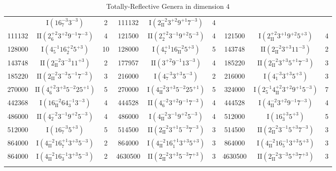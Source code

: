 \documentclass{amsart}
\theoremstyle{definition}
\theoremstyle{remark}
\begin{document}
\begin{center}
\begin{longtable}{ccc|ccc|ccc}
&$\mathrm{I}(16_{7}^{-3}3^{-3})$&2&111132&$\mathrm{I}(2_{\mathrm{II}}^{-2}3^{+2}9^{+1}7^{-3})$&4\\111132&$\mathrm{II}(2_{6}^{+2}3^{+2}9^{-1}7^{-3})$&4&121500&$\mathrm{II}(2_{2}^{+2}3^{-1}9^{+2}5^{-3})$&4&121500&$\mathrm{I}(2_{\mathrm{II}}^{+2}3^{+1}9^{+2}5^{+3})$&4\\128000&$\mathrm{I}(4_{5}^{-1}16_{2}^{+2}5^{+3})$&10&128000&$\mathrm{I}(4_{7}^{+1}16_{\mathrm{II}}^{-2}5^{+3})$&5&143748&$\mathrm{II}(2_{\mathrm{II}}^{-2}3^{+3}11^{-3})$&2\\143748&$\mathrm{II}(2_{\mathrm{II}}^{-2}3^{-3}11^{+3})$&2&177957&$\mathrm{II}(3^{+2}9^{-1}13^{-3})$&4&185220&$\mathrm{II}(2_{\mathrm{II}}^{-2}3^{+3}5^{+1}7^{-3})$&3\\185220&$\mathrm{II}(2_{\mathrm{II}}^{-2}3^{-3}5^{-1}7^{-3})$&3&216000&$\mathrm{I}(4_{7}^{-3}3^{+3}5^{-3})$&2&216000&$\mathrm{I}(4_{1}^{-3}3^{+3}5^{+3})$&3\\270000&$\mathrm{II}(4_{6}^{+2}3^{+3}5^{-2}25^{+1})$&5&270000&$\mathrm{I}(4_{\mathrm{II}}^{-2}3^{+3}5^{-2}25^{+1})$&5&324000&$\mathrm{I}(2_{5}^{-1}4_{\mathrm{II}}^{+2}3^{+2}9^{+1}5^{-3})$&7\\442368&$\mathrm{I}(16_{\mathrm{II}}^{-2}64_{3}^{-1}3^{-3})$&4&444528&$\mathrm{II}(4_{6}^{-2}3^{+2}9^{-1}7^{-3})$&4&444528&$\mathrm{I}(4_{\mathrm{II}}^{-2}3^{+2}9^{-1}7^{-3})$&4\\486000&$\mathrm{II}(4_{2}^{-2}3^{-1}9^{+2}5^{-3})$&4&486000&$\mathrm{I}(4_{\mathrm{II}}^{-2}3^{-1}9^{+2}5^{-3})$&4&512000&$\mathrm{I}(16_{3}^{+3}5^{+3})$&5\\512000&$\mathrm{I}(16_{7}^{-3}5^{+3})$&5&514500&$\mathrm{II}(2_{\mathrm{II}}^{-2}3^{+1}5^{-3}7^{-3})$&3&514500&$\mathrm{II}(2_{\mathrm{II}}^{-2}3^{-1}5^{+3}7^{-3})$&3\\864000&$\mathrm{I}(4_{\mathrm{II}}^{-2}16_{7}^{+1}3^{+3}5^{-3})$&2&864000&$\mathrm{I}(4_{\mathrm{II}}^{-2}16_{1}^{+1}3^{+3}5^{+3})$&3&864000&$\mathrm{I}(4_{\mathrm{II}}^{-2}16_{5}^{-1}3^{+3}5^{+3})$&3\\864000&$\mathrm{I}(4_{\mathrm{II}}^{-2}16_{3}^{-1}3^{+3}5^{-3})$&2&4630500&$\mathrm{II}(2_{\mathrm{II}}^{-2}3^{+3}5^{-3}7^{+3})$&3&4630500&$\mathrm{II}(2_{\mathrm{II}}^{-2}3^{-3}5^{+3}7^{+3})$&3\\

\caption{Totally-Reflective Genera in dimension $4$} 
\end{longtable}
\end{center}


 
\end{document}
